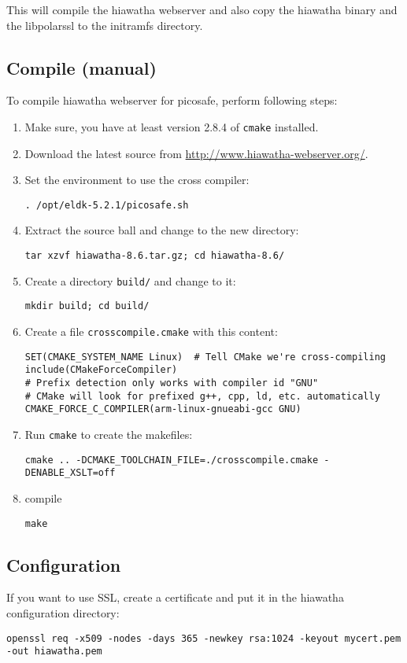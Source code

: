 This will compile the hiawatha webserver and also copy the hiawatha binary and
the libpolarssl to the initramfs directory.


\subsection{Compile (manual)}
To compile hiawatha webserver for picosafe, perform following steps:

\begin{enumerate}
\item Make sure, you have at least version 2.8.4 of \texttt{cmake} installed.
\item Download the latest source from \url{http://www.hiawatha-webserver.org/}.
\item Set the environment to use the cross compiler:

\texttt{. /opt/eldk-5.2.1/picosafe.sh}
\item Extract the source ball and change to the new directory:

\texttt{tar xzvf hiawatha-8.6.tar.gz; cd hiawatha-8.6/}
\item Create a directory \texttt{build/} and change to it:

\texttt{mkdir build; cd build/}
\item Create a file \texttt{crosscompile.cmake} with this content:

\begin{lstlisting}
SET(CMAKE_SYSTEM_NAME Linux)  # Tell CMake we're cross-compiling
include(CMakeForceCompiler)
# Prefix detection only works with compiler id "GNU"
# CMake will look for prefixed g++, cpp, ld, etc. automatically
CMAKE_FORCE_C_COMPILER(arm-linux-gnueabi-gcc GNU)
\end{lstlisting}

\item Run \texttt{cmake} to create the makefiles:

\texttt{cmake .. -DCMAKE\_TOOLCHAIN\_FILE=./crosscompile.cmake -DENABLE\_XSLT=off}

\item compile

\texttt{make}

\end{enumerate}


\subsection{Configuration}

If you want to use SSL, create a certificate and put it in the hiawatha configuration directory:

\texttt{openssl req -x509 -nodes -days 365 -newkey rsa:1024 -keyout mycert.pem -out hiawatha.pem}
